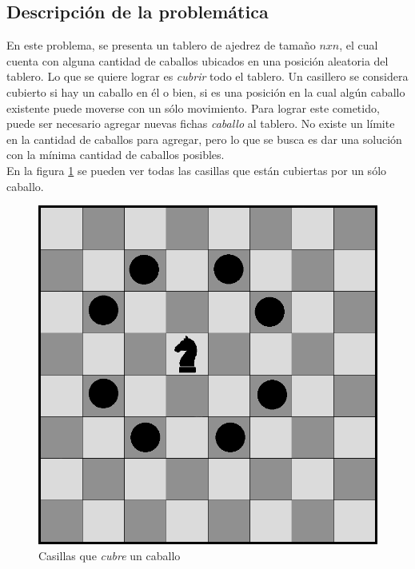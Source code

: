 \documentclass[a4paper]{article}
\begin{document}
\subsection{Descripci\'on de la problem\'atica}

En este problema, se presenta un tablero de ajedrez de tama\~no $nxn$, el cual cuenta con alguna cantidad de caballos ubicados en una posici\'on aleatoria del tablero. Lo que se quiere lograr es \emph{cubrir} todo el tablero. Un casillero se considera cubierto si hay un caballo en \'el o bien, si es una posici\'on en la cual alg\'un caballo existente puede moverse con un s\'olo movimiento. Para lograr este cometido, puede ser necesario agregar nuevas fichas \emph{caballo} al tablero. No existe un l\'imite en la cantidad de caballos para agregar, pero lo que se busca es dar una soluci\'on con la m\'inima cantidad de caballos posibles.\\


En la figura \ref{caballito} se pueden ver todas las casillas que est\'an cubiertas por un s\'olo caballo.


 \begin{figure}[h!]
   \begin{center}
 	\includegraphics[scale=0.3]{imagenes/ej3/caballito.png}
 	\caption{Casillas que \emph{cubre} un caballo}
 	\label{caballito}	
   \end{center}
 \end{figure}
\end{document}
